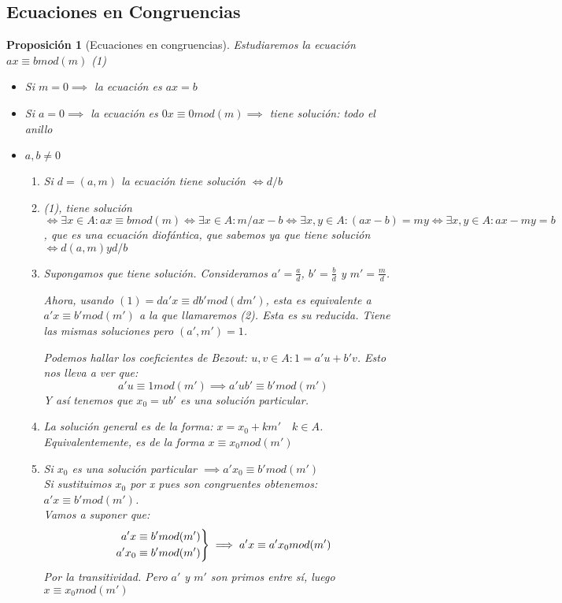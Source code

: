 \documentclass[11pt, a4paper, titlepage]{article}
\makeatletter
\renewenvironment{proof}[1][\proofname] {\vspace{-15pt}\par\pushQED{\qed}\normalfont\topsep6\p@\@plus6\p@\relax\trivlist\item[\hskip\labelsep\it#1\@addpunct{.}]\ignorespaces}{\popQED\endtrivlist\@endpefalse}
\theoremstyle{theorem-style}
\newtheorem*{nprop}{Proposición}
\theoremstyle{definition-style}
\theoremstyle{remark-style}
\theoremstyle{example-style}
\newenvironment{rcases}
  {\left.\begin{aligned}}
  {\end{aligned}\right\rbrace}
\makeatother
\begin{document}
\subsection{Ecuaciones en Congruencias}
\begin{nprop}[Ecuaciones en congruencias]

Estudiaremos la ecuación $ax \equiv b mod(m)$ (1)
\begin{itemize}
	\item Si $m = 0 \implies$ la ecuación es $ax = b$
	\item Si $a = 0\implies $ la ecuación es $0x \equiv 0 mod(m) \implies$ tiene solución: todo el anillo
	\item $a,b \ne 0$
	\begin{enumerate}
	
	\item Si $d = (a,m)$ la ecuación tiene solución $\iff  d/b$\\
	\begin{proof}
	(1), tiene solución $\iff \exists x \in A : ax \equiv bmod(m) \iff \exists x \in A : m/ax-b \iff \exists x,y \in A : (ax-b) = my \iff \exists x,y \in A: ax -my  = b$, que es una ecuación diofántica, que sabemos ya que tiene solución $\iff d(a,m) y d/b$
\end{proof}
	\item  Supongamos que tiene solución. Consideramos $a'= \frac{a}{d}$, $b'= \frac{b}{d}$ y $m' = \frac{m}{d}$.
	
	Ahora, usando $(1) = da'x \equiv db'mod(dm')$, esta es equivalente a $a'x \equiv b' mod(m')$ a la que llamaremos (2). Esta es su reducida. Tiene las mismas soluciones pero $(a',m') = 1$.
	
	Podemos hallar los coeficientes de Bezout: $u,v \in A :  1 = a'u + b'v$. Esto nos lleva a ver que:
	\[
	a'u \equiv 1 mod(m') \implies a'ub' \equiv b' mod(m')
	\]
	Y así tenemos que $x_0 = ub'$ es una solución particular.
	
	\item La solución general es de la forma: $x = x_0 +km' \quad k \in A$. Equivalentemente, es de la forma $x \equiv x_0 mod(m')$\\
	\begin{proof}
	Si $x_0$ es una solución particular $\implies a'x_0 \equiv b'mod(m')$\\
	Si sustituimos $x_0$ por x pues son congruentes obtenemos: $a'x \equiv b' mod(m')$.\\
	Vamos a suponer que:
	\[
	\begin{rcases}
	a'x \equiv b' mod(m')\\
	a' x_0 \equiv b' mod(m')
\end{rcases} \implies a'x \equiv a'x_0 mod(m')
	\]
Por la transitividad. Pero $a'$ y $m'$ son primos entre sí, luego $x \equiv x_0 mod(m')$
\end{proof}


\end{enumerate}
\end{itemize}
\end{nprop}
\end{document}
